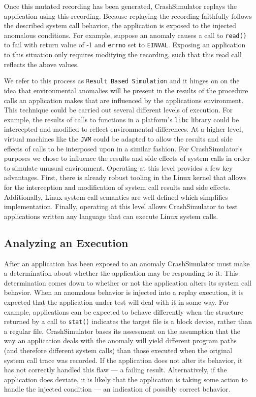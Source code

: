 Once this mutated recording has been generated, CrashSimulator replays the
application using this recording.
Because replaying the
recording faithfully follows the described system call behavior, the
application is exposed to the injected
anomalous conditions.  For
example, suppose an anomaly causes a call to {\tt read()} to fail with
return value of -1 and {\tt errno} set to {\tt EINVAL}.  Exposing an
application to this situation only requires modifying the recording,
such that this read call reflects the above values.

We refer to this process as {\tt Result Based Simulation} and it hinges on
on the idea that environmental anomalies will be present in the results of
the procedure calls an application makes that are influenced by the
applications environment.
This technique could be carried out several different levels
of execution.  For example, the results of calls to functions in a
platform's {\tt libc} library could be intercepted and modified to reflect
environmental differences.  At a higher level, virtual machines like the
{\tt JVM} could be adapted to allow the results and side effects of calls
to be interposed upon in a similar fashion.
For CrashSimulator's purposes we chose to influence
the results and side effects of system calls in order to simulate
unusual environment.  Operating at this level provides a few key
advantages.  First, there is already robust tooling in the Linux kernel
that allows for the interception and modification of system call results
and side effects.  Additionally, Linux system call semantics are well
defined which simplifies implementation.  Finally, operating at this level
allows CrashSimulator to test applications written any language that can
execute Linux system calls.

\subsection{Analyzing an Execution}

After an application has been exposed to an anomaly CrashSimulator must
make a determination about whether the application may be responding to it.
This determination comes down to whether or not
the application alters its
system call behavior.  When an anomalous
behavior is injected into a replay execution,
it is expected that the application under
test will deal with it in some way.  For example, applications can
be expected to behave differently when the structure returned by a call to
{\tt stat()} indicates the target file is a block device,
rather than a regular
file.  CrashSimulator bases its assessment on the assumption that the way
an
application deals with the anomaly will yield
different program paths (and therefore different system calls) than
those
executed when the original system call trace was recorded.
If the application
does not alter its behavior, it has not
correctly handled this flaw --- a failing result.  Alternatively, if the
application does deviate, it is likely that the application is taking some
action to handle the injected condition --- an indication of possibly
correct behavior.

